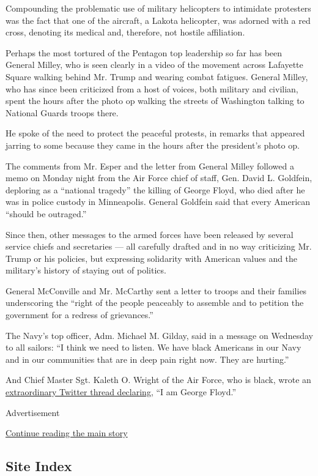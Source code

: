Compounding the problematic use of military helicopters to intimidate
protesters was the fact that one of the aircraft, a Lakota helicopter,
was adorned with a red cross, denoting its medical and, therefore, not
hostile affiliation.

Perhaps the most tortured of the Pentagon top leadership so far has been
General Milley, who is seen clearly in a video of the movement across
Lafayette Square walking behind Mr. Trump and wearing combat fatigues.
General Milley, who has since been criticized from a host of voices,
both military and civilian, spent the hours after the photo op walking
the streets of Washington talking to National Guards troops there.

He spoke of the need to protect the peaceful protests, in remarks that
appeared jarring to some because they came in the hours after the
president's photo op.

The comments from Mr. Esper and the letter from General Milley followed
a memo on Monday night from the Air Force chief of staff, Gen. David L.
Goldfein, deploring as a ``national tragedy'' the killing of George
Floyd, who died after he was in police custody in Minneapolis. General
Goldfein said that every American ``should be outraged.''

Since then, other messages to the armed forces have been released by
several service chiefs and secretaries --- all carefully drafted and in
no way criticizing Mr. Trump or his policies, but expressing solidarity
with American values and the military's history of staying out of
politics.

General McConville and Mr. McCarthy sent a letter to troops and their
families underscoring the ``right of the people peaceably to assemble
and to petition the government for a redress of grievances.''

The Navy's top officer, Adm. Michael M. Gilday, said in a message on
Wednesday to all sailors: ``I think we need to listen. We have black
Americans in our Navy and in our communities that are in deep pain right
now. They are hurting.''

And Chief Master Sgt. Kaleth O. Wright of the Air Force, who is black,
wrote an
\href{https://twitter.com/cmsaf18/status/1267572332907954177}{extraordinary
Twitter thread declaring}, ``I am George Floyd.''

Advertisement

\protect\hyperlink{after-bottom}{Continue reading the main story}

\hypertarget{site-index}{%
\subsection{Site Index}\label{site-index}}

